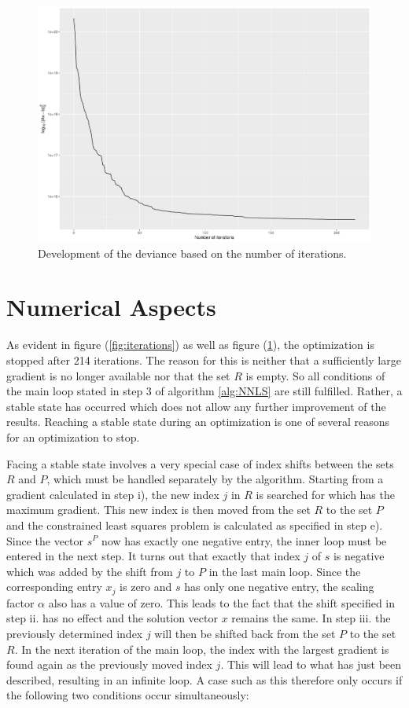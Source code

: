 \begin{figure}
	\centering
	\includegraphics[width=\textwidth]{figures/chapter_NNLS/residuals}
	\caption{Development of the deviance based on the number of iterations.}
	\label{fig:residuals}
\end{figure}

\section{Numerical Aspects}
As evident in figure (\ref{fig:iterations}) as well as figure (\ref{fig:residuals}), the optimization is stopped after 214 iterations. The reason for this is neither that a sufficiently large gradient is no longer available nor that the set $R$ is empty. So all conditions of the main loop stated in step 3 of algorithm \ref{alg:NNLS} are still fulfilled. 
Rather, a stable state has occurred which does not allow any further improvement of the results. Reaching a stable state during an optimization is one of several reasons for an optimization to stop.

Facing a stable state involves a very special case of index shifts between the sets $R$ and $P$, which must be handled separately by the algorithm. Starting from a gradient calculated in step i), the new index $j$ in $R$ is searched for which has the maximum gradient. This new index is then moved from the set $R$ to the set $P$ and the constrained least squares problem is calculated as specified in step e). Since the vector $s^P$ now has exactly one negative entry, the inner loop must be entered in the next step. It turns out that exactly that index $j$ of $s$ is negative which was added by the shift from $j$ to $P$ in the last main loop. 
Since the corresponding entry $x_j$ is zero and $s$ has only one negative entry, the scaling factor $\alpha$ also has a value of zero. This leads to the fact that the shift specified in step ii. has no effect and the solution vector $x$ remains the same. In step iii. the previously determined index $j$ will then be shifted back from the set $P$ to the set $R$. In the next iteration of the main loop, the index with the largest gradient is found again as the previously moved index $j$. This will lead to what has just been described, resulting in an infinite loop. A case such as this therefore only occurs if the following two conditions occur simultaneously: 

